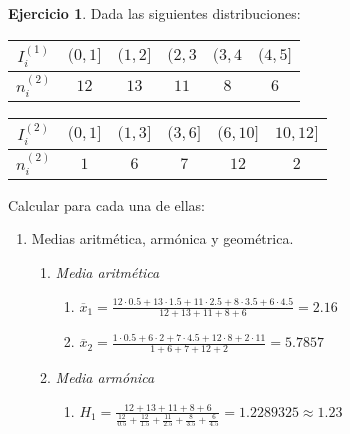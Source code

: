 \documentclass[a4paper, 12pt]{article}
\theoremstyle{definition}
\newtheorem{ej}{Ejercicio}
\begin{document}
\begin{ej}
Dada las siguientes distribuciones:

\begin{center}

\begin{tabular}{|c|c|c|c|c|c|}
\hline
     \(I_i ^{(1)}\) & \((0,1]\) & \((1,2]\) & \((2,3\) & \((3,4\) & \((4,5]\)  \\
     \hline
     \(n_i^{(2)}\) & \(12\) & \(13\) & \(11\) & \(8\) & \(6\) \\
     \hline
\end{tabular}

\vspace{0.3cm}

\begin{tabular}{|c|c|c|c|c|c|}
\hline
     \(I_i^{(2)}\) & \((0,1]\) & \((1,3]\) & \((3,6]\) & \((6,10]\) & \(10,12]\) \\
     \hline
     \(n_i^{(2)}\) & \(1\) & \(6\) & \(7\) & \(12\) & \(2\) \\
     \hline
\end{tabular}

\end{center}

\newpage

Calcular para cada una de ellas:

\begin{enumerate}[label=\textit{\alph*)}]
    \item Medias aritmética, armónica y geométrica.
    \begin{enumerate}[label=]
        \item \textit{Media aritmética}
        \begin{enumerate}[label=\arabic*.]
        \centering
            \item \(\overline{x}_1 = \frac{12\cdot0.5 + 13\cdot 1.5 + 11 \cdot 2.5 + 8 \cdot 3.5 + 6 \cdot 4.5}{12+13+11+8+6} = 2.16\)
            
            \item \(\overline{x}_2 = \frac{1 \cdot 0.5 + 6 \cdot 2 + 7 \cdot 4.5 + 12 \cdot 8 + 2 \cdot 11}{1+6+7+12+2} = 5.7857\)
        \end{enumerate}
        
        \item \textit{Media armónica}
        \begin{enumerate}[label=\arabic*.]
            \item \(H_1 = \frac{12+13+11+8+6}{\frac{12}{0.5} + \frac{12}{1.5} + \frac{11}{2.5} + \frac{8}{3.5} + \frac{6}{4.5}} = 1.2289325 \approx 1.23\)
            

\end{enumerate}
\end{enumerate}
\end{enumerate}
\end{ej}
\end{document}
